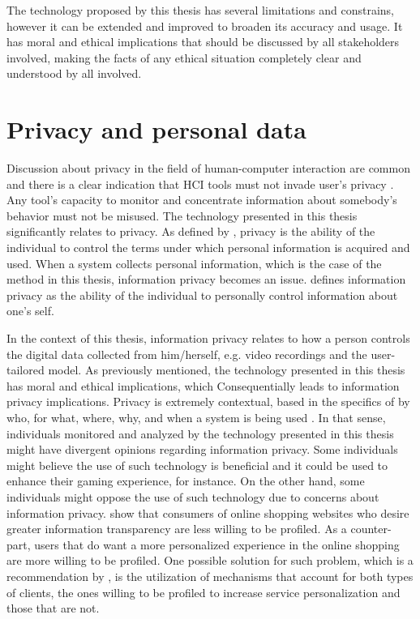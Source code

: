 The technology proposed by this thesis has several limitations and constrains, however it can be extended and improved to broaden its accuracy and usage. It has moral and ethical implications that should be discussed by all stakeholders involved, making the facts of any ethical situation completely clear and understood by all involved.

\section{Privacy and personal data}

Discussion about privacy in the field of human-computer interaction are common and there is a clear indication that HCI tools must not invade user's privacy \parencite{pantic2003toward}. Any tool's capacity to monitor and concentrate information about somebody's behavior must not be misused. The technology presented in this thesis significantly relates to privacy. As defined by \textcite{culnan2000protecting}, privacy is the ability of the individual to control the terms under which personal information is acquired and used. When a system collects personal information, which is the case of the method in this thesis, information privacy becomes an issue. \textcite{stone1983field} defines information privacy as the ability of the individual to personally control information about one's self.

In the context of this thesis, information privacy relates to how a person controls the digital data collected from him/herself, e.g. video recordings and the user-tailored model. As previously mentioned, the technology presented in this thesis has moral and ethical implications, which Consequentially leads to information privacy implications. Privacy is extremely contextual, based in the specifics of by who, for what, where, why, and when a system is being used \parencite{ackerman2005privacy}. In that sense, individuals monitored and analyzed by the technology presented in this thesis might have divergent opinions regarding information privacy. Some individuals might believe the use of such technology is beneficial and it could be used to enhance their gaming experience, for instance. On the other hand, some individuals might oppose the use of such technology due to concerns about information privacy. \textcite{awad2006personalization} show that consumers of online shopping websites who desire greater information transparency are less willing to be profiled. As a counter-part, users that do want a more personalized experience in the online shopping are more willing to be profiled. One possible solution for such problem, which is a recommendation by \textcite{awad2006personalization}, is the utilization of mechanisms that account for both types of clients, the ones willing to be profiled to increase service personalization and those that are not.

